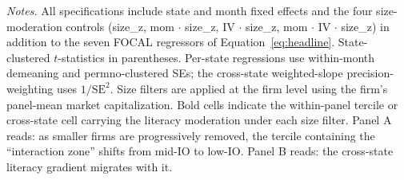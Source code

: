 \begin{table}[t]
\medskip
{\footnotesize\textit{Notes.} All specifications include state and month fixed effects and the four size-moderation controls (size\_z, mom $\cdot$ size\_z, IV $\cdot$ size\_z, mom $\cdot$ IV $\cdot$ size\_z) in addition to the seven FOCAL regressors of Equation~\eqref{eq:headline}. State-clustered $t$-statistics in parentheses. Per-state regressions use within-month demeaning and permno-clustered SEs; the cross-state weighted-slope precision-weighting uses $1/\mathrm{SE}^{2}$. Size filters are applied at the firm level using the firm's panel-mean market capitalization. Bold cells indicate the within-panel tercile or cross-state cell carrying the literacy moderation under each size filter. Panel A reads: as smaller firms are progressively removed, the tercile containing the ``interaction zone'' shifts from mid-IO to low-IO. Panel B reads: the cross-state literacy gradient migrates with it.}
\end{table}
